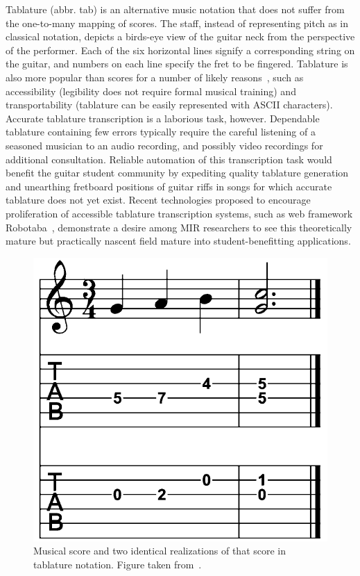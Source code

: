 \documentclass[convention,peer-reviewed]{aesconf}
\begin{document}
Tablature (abbr. tab) is an alternative music notation that does not suffer from the one-to-many mapping of scores. The staff, instead of representing pitch as in classical notation, depicts a birds-eye view of the guitar neck from the perspective of the performer. Each of the six horizontal lines signify a corresponding string on the guitar, and numbers on each line specify the fret to be fingered. Tablature is also more popular than scores for a number of likely reasons~\cite{macrae2010}, such as accessibility (legibility does not require formal musical training) and transportability (tablature can be easily represented with ASCII characters). Accurate tablature transcription is a laborious task, however. Dependable tablature containing few errors typically require the careful listening of a seasoned musician to an audio recording, and possibly video recordings for additional consultation. Reliable automation of this transcription task would benefit the guitar student community by expediting quality tablature generation and unearthing fretboard positions of guitar riffs in songs for which accurate tablature does not yet exist. Recent technologies proposed to encourage proliferation of accessible tablature transcription systems, such as web framework Robotaba~\cite{burlet2013}, demonstrate a desire among MIR researchers to see this theoretically mature but practically nascent field mature into student-benefitting applications. 
\begin{figure}[!htbp] 
\centering
\includegraphics[scale=0.2]{figs/score-tabs}
\caption{Musical score and two identical realizations of that score in tablature notation. Figure taken from~\cite{barbanchoi2012}.}
\label{fig:score-tabs}
\end{figure}
\end{document}
